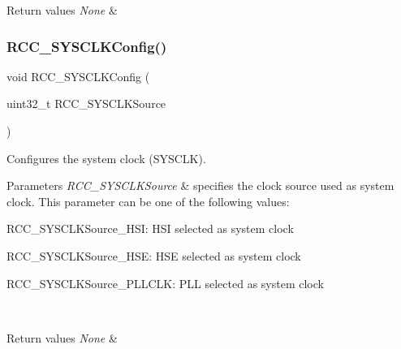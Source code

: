 \begin{DoxyRetVals}{Return values}
{\em None} & \\
\hline
\end{DoxyRetVals}
\mbox{\label{group___r_c_c___private___functions_ga3551a36a8f0a3dc96a74d6b939048337}} 
\subsubsection{\texorpdfstring{RCC\_SYSCLKConfig()}{RCC\_SYSCLKConfig()}}
{\footnotesize\ttfamily void R\+C\+C\+\_\+\+S\+Y\+S\+C\+L\+K\+Config (\begin{DoxyParamCaption}\item[{uint32\+\_\+t}]{R\+C\+C\+\_\+\+S\+Y\+S\+C\+L\+K\+Source }\end{DoxyParamCaption})}



Configures the system clock (S\+Y\+S\+C\+LK). 


\begin{DoxyParams}{Parameters}
{\em R\+C\+C\+\_\+\+S\+Y\+S\+C\+L\+K\+Source} & specifies the clock source used as system clock. This parameter can be one of the following values\+: \begin{DoxyItemize}
\item R\+C\+C\+\_\+\+S\+Y\+S\+C\+L\+K\+Source\+\_\+\+H\+SI\+: H\+SI selected as system clock \item R\+C\+C\+\_\+\+S\+Y\+S\+C\+L\+K\+Source\+\_\+\+H\+SE\+: H\+SE selected as system clock \item R\+C\+C\+\_\+\+S\+Y\+S\+C\+L\+K\+Source\+\_\+\+P\+L\+L\+C\+LK\+: P\+LL selected as system clock \end{DoxyItemize}
\\
\hline
\end{DoxyParams}

\begin{DoxyRetVals}{Return values}
{\em None} & \\
\hline
\end{DoxyRetVals}
\mbox{\label{group___r_c_c___private___functions_ga895b3ff3d143c990f1cd0146aa260081}} 
